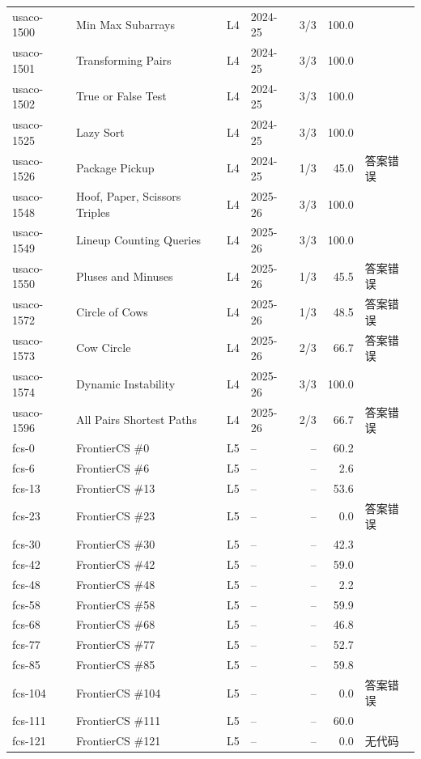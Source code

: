 \documentclass[11pt,a4paper,fontset=none]{ctexart}
\begin{document}
{\begin{longtable}{@{}l>{\raggedright\arraybackslash}p{3.4cm}llrr>{\raggedright\arraybackslash}p{3.1cm}@{}}
usaco-1500 & Min Max Subarrays & L4 & 2024-25 & 3/3 & 100.0 &  \\
usaco-1501 & Transforming Pairs & L4 & 2024-25 & 3/3 & 100.0 &  \\
usaco-1502 & True or False Test & L4 & 2024-25 & 3/3 & 100.0 &  \\
usaco-1525 & Lazy Sort & L4 & 2024-25 & 3/3 & 100.0 &  \\
usaco-1526 & Package Pickup & L4 & 2024-25 & 1/3 & 45.0 & 答案错误 \\
usaco-1548 & Hoof, Paper, Scissors Triples & L4 & 2025-26 & 3/3 & 100.0 &  \\
usaco-1549 & Lineup Counting Queries & L4 & 2025-26 & 3/3 & 100.0 &  \\
usaco-1550 & Pluses and Minuses & L4 & 2025-26 & 1/3 & 45.5 & 答案错误 \\
usaco-1572 & Circle of Cows & L4 & 2025-26 & 1/3 & 48.5 & 答案错误 \\
usaco-1573 & Cow Circle & L4 & 2025-26 & 2/3 & 66.7 & 答案错误 \\
usaco-1574 & Dynamic Instability & L4 & 2025-26 & 3/3 & 100.0 &  \\
usaco-1596 & All Pairs Shortest Paths & L4 & 2025-26 & 2/3 & 66.7 & 答案错误 \\
fcs-0 & FrontierCS \#0 & L5 & – & – & 60.2 &  \\
fcs-6 & FrontierCS \#6 & L5 & – & – & 2.6 &  \\
fcs-13 & FrontierCS \#13 & L5 & – & – & 53.6 &  \\
fcs-23 & FrontierCS \#23 & L5 & – & – & 0.0 & 答案错误 \\
fcs-30 & FrontierCS \#30 & L5 & – & – & 42.3 &  \\
fcs-42 & FrontierCS \#42 & L5 & – & – & 59.0 &  \\
fcs-48 & FrontierCS \#48 & L5 & – & – & 2.2 &  \\
fcs-58 & FrontierCS \#58 & L5 & – & – & 59.9 &  \\
fcs-68 & FrontierCS \#68 & L5 & – & – & 46.8 &  \\
fcs-77 & FrontierCS \#77 & L5 & – & – & 52.7 &  \\
fcs-85 & FrontierCS \#85 & L5 & – & – & 59.8 &  \\
fcs-104 & FrontierCS \#104 & L5 & – & – & 0.0 & 答案错误 \\
fcs-111 & FrontierCS \#111 & L5 & – & – & 60.0 &  \\
fcs-121 & FrontierCS \#121 & L5 & – & – & 0.0 & 无代码 \\

\end{longtable}}
\end{document}
